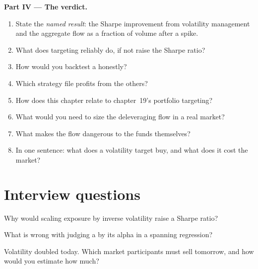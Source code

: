 \begin{problem}
\medskip\noindent\textbf{Part IV --- The verdict.}
\begin{enumerate}[resume]
\item State the \emph{named result}: the Sharpe improvement from volatility management and the aggregate flow as a fraction of volume after a spike.
\item What does targeting reliably do, if not raise the Sharpe ratio?
\item How would you backtest a  honestly?
\item Which strategy file profits from the others?
\item How does this chapter relate to chapter~19's portfolio targeting?
\item What would you need to size the deleveraging flow in a real market?
\item What makes the flow dangerous to the funds themselves?
\item In one sentence: what does a volatility target buy, and what does it cost the market?
\end{enumerate}
\end{problem}

\section{Interview questions}

\begin{interviewq}\label{iq:s1:volatility-targeting-and-risk-managed-portfolios:1}
Why would scaling exposure by inverse volatility raise a Sharpe ratio?
\end{interviewq}

\begin{interviewq}\label{iq:s1:volatility-targeting-and-risk-managed-portfolios:2}
What is wrong with judging a  by its alpha in a spanning regression?
\end{interviewq}

\begin{interviewq}\label{iq:s1:volatility-targeting-and-risk-managed-portfolios:3}
Volatility doubled today. Which market participants must sell tomorrow, and how would you estimate how much?
\end{interviewq}

